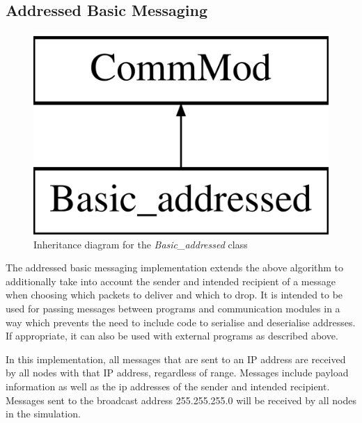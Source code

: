 \subsection{Addressed Basic Messaging}
\begin{figure}
\centering
\includegraphics[scale=0.2]{../documentation/latex/class_basic__addressed}	
\caption{Inheritance diagram for the \textit{Basic\_addressed} class}
\end{figure}

The addressed basic messaging implementation extends the above algorithm to additionally take into account the sender and intended recipient of a message when choosing which packets to deliver and which to drop. It is intended to be used for passing messages between programs and communication modules in a way which prevents the need to include code to serialise and deserialise addresses. If appropriate, it can also be used with external programs as described above.

In this implementation, all messages that are sent to an IP address are received by all nodes with that IP address, regardless of range. Messages include payload information as well as the ip addresses of the sender and intended recipient. Messages sent to the broadcast address 255.255.255.0 will be received by all nodes in the simulation.	
	
